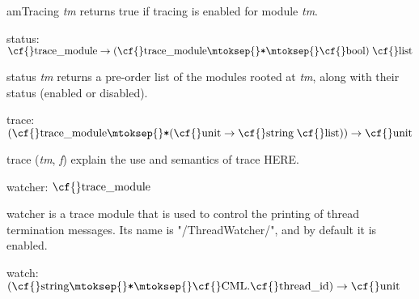 \begin{descr}
\begin{speccomment}
\item {\cf \small am\-Tracing \mbox{\cf \small \textit{tm}}           } 
returns {\cf \small true} if tracing is enabled for module \mbox{\cf \small \textit{tm}}.     \end{speccomment}
\item {}{} {\cf status: \(\mbox{\cf{}trace\_module}\rightarrow(\mbox{\cf{}trace\_module}\mtoksep{}\verb,*,\mtoksep{}\mbox{\cf{}bool})\;\mbox{\cf{}list}\)}\label{val-TRACE_CML.status}


\begin{speccomment}
\item {\cf \small status \mbox{\cf \small \textit{tm}}           } 
returns a pre-order list of the modules rooted at \mbox{\cf \small \textit{tm}}, along 	  with their status (enabled or disabled).     \end{speccomment}
\item {}{} {\cf trace: \((\mbox{\cf{}trace\_module}\mtoksep{}\verb,*,(\mbox{\cf{}unit}\rightarrow \mbox{\cf{}string}\;\mbox{\cf{}list}))\rightarrow \mbox{\cf{}unit}\)}\label{val-TRACE_CML.trace}


\begin{speccomment}
\item {\cf \small trace (\mbox{\cf \small \textit{tm}}, \mbox{\cf \small \textit{f}})           } 
explain the use and semantics of trace HERE.     \end{speccomment}
\item {}{} {\cf watcher: \(\mbox{\cf{}trace\_module}\)}\label{val-TRACE_CML.watcher}


\begin{speccomment}
\item {\cf \small watcher           } 
is a trace module that is used to control the printing of thread 	  termination messages. 	  Its name is {\cf \small "/Thread\-Watcher/"}, and by default it is enabled.     \end{speccomment}
\item {}{} {\cf watch: \((\mbox{\cf{}string}\mtoksep{}\verb,*,\mtoksep{}\mbox{\cf{}CML}.\mbox{\cf{}thread\_id})\rightarrow \mbox{\cf{}unit}\)}\label{val-TRACE_CML.watch}



\end{descr}

